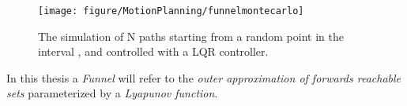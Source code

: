 \begin{figure}
  \texttt{[image: figure/MotionPlanning/funnelmontecarlo]}
  \caption{The simulation of N paths starting from a random point in the
    interval , and controlled with a LQR controller.}
\end{figure}

In this thesis a \textit{Funnel} will refer to the \textit{outer approximation of
forwards reachable sets} parameterized by a \textit{Lyapunov function}.
